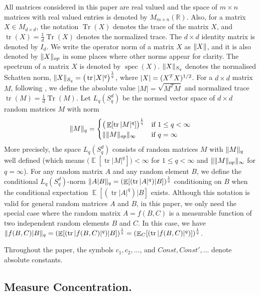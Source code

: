 \documentclass[11pt]{amsart}
\numberwithin{equation}{section}
\numberwithin{equation}{section}
\DeclareMathOperator{\E}{\mathbb{E}}
\DeclareMathOperator*{\tr}{tr}
\DeclareMathOperator*{\Tr}{Tr}
\DeclareMathOperator{\spec}{spec}
\DeclarePairedDelimiter{\norm}{\lVert}{\rVert}
\DeclarePairedDelimiter{\abs}{\lvert}{\rvert}
\begin{document}
All matrices considered in this paper are real valued and the space of $m \times n$ matrices with real valued entries is denoted by $M_{m \times n}(\mathbb{R})$. Also, for a matrix $X \in M_{d \times d}$, the notation $\Tr (X)$ denotes the trace of the matrix $X$, and $\tr (X) = \frac{1}{d} \Tr (X)$ denotes the normalized trace. The $d \times d$ identity matrix is denoted by $I_d$. We write the operator norm of a matrix $X$ as $\norm{X}$, and it is also denoted by $\norm{X}_{op}$ in some places where other norms appear for clarity. The spectrum of a matrix $X$ is denoted by $\spec(X)$. $\norm{X}_{S_q}$ denotes the normalised Schatten norm, $\norm{X}_{S_{q}}=\big(\tr |X|^{q}\big)^{\frac{1}{q}}$, where $\abs{X} = (X^TX)^{1/2}$. For a $d \times d$ matrix $M$, following \cite{brailovskaya2022universality}, we define the absolute value $|M|=\sqrt{M^TM}$ and normalized trace $\tr(M)=\frac {1}{d}\Tr(M)$. Let $L_q(S_q^d)$ be the normed vector space of $d\times d$ random matrices $M$ with norm
\begin{align*}
	\norm{M}_q = \begin{cases}
	\big(\E[\tr |M|^q]\big)^{\frac{1}{q}} & \text{if }1\le q<\infty\\
	\| \norm{M}_{op} \|_\infty & \text{if }q=\infty
	\end{cases}
\end{align*}
More precisely, the space $L_q(S_q^d)$ consists of random matrices $M$ with $\norm{M}_q$ well defined (which means $\big(\E[\tr |M|^q]\big)<\infty$ for $1\le q<\infty$ and $\| \norm{M}_{op} \|_\infty$ for $q=\infty$). For any random matrix $A$ and any random element $B$, we define the conditional $L_q(S_q^d)$-norm $\norm{A|B}_{q}=(\E[(\tr|A|^{q})|B])^{\frac{1}{q}}$ conditioning on $B$ when the conditional expectation $\E[(\tr|A|^{q})|B]$ exists. Although this notation is valid for general random matrices $A$ and $B$, in this paper, we only need the special case where the random matrix $A=f(B,C)$ is a measurable function of two independent random elements $B$ and $C$. In this case, we have $\norm{f(B,C)|B}_{q}=(\E[(\tr|f(B,C)|^{q})|B])^{\frac{1}{q}}=(\E_{C}[(\tr |f(B,C)|^{q})])^{\frac{1}{q}}$.

Throughout the paper, the symbols $c_1, c_2, ...$, and $Const, Const', ...$ denote absolute constants. 

\bigskip 

\subsection{Measure Concentration.} \label{subsec:measconc}
\end{document}
